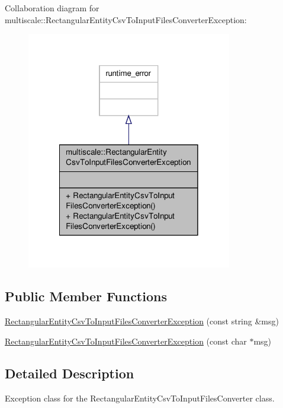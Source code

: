 Collaboration diagram for multiscale\-:\-:Rectangular\-Entity\-Csv\-To\-Input\-Files\-Converter\-Exception\-:\nopagebreak
\begin{figure}[H]
\begin{center}
\leavevmode
\includegraphics[width=254pt]{classmultiscale_1_1RectangularEntityCsvToInputFilesConverterException__coll__graph}
\end{center}
\end{figure}
\subsection*{Public Member Functions}
\begin{DoxyCompactItemize}
\item 
\hyperlink{classmultiscale_1_1RectangularEntityCsvToInputFilesConverterException_a392163de5a61c71d6d8d08b778e4d78d}{Rectangular\-Entity\-Csv\-To\-Input\-Files\-Converter\-Exception} (const string \&msg)
\item 
\hyperlink{classmultiscale_1_1RectangularEntityCsvToInputFilesConverterException_a0a148fb0719e765b3186e85f5ba2ba43}{Rectangular\-Entity\-Csv\-To\-Input\-Files\-Converter\-Exception} (const char $\ast$msg)
\end{DoxyCompactItemize}


\subsection{Detailed Description}
Exception class for the Rectangular\-Entity\-Csv\-To\-Input\-Files\-Converter class. 

